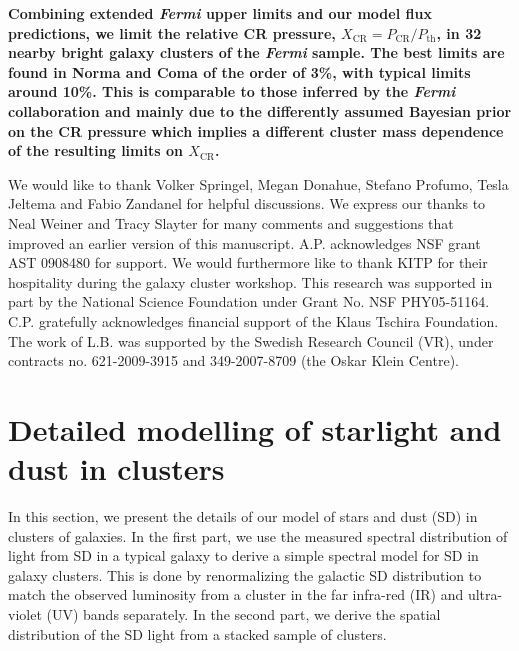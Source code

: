 \documentclass[10pt,aps,pra,reprint,amsmath,amsfonts,amssymb,showpacs,nofootinbib,floatfix]{revtex4-1}
\def\C#1{{\bf #1}}
\newcommand{\Fermi}{{\em Fermi}\xspace}
\newcommand{\rmn}{\mathrm}
\newcommand{\CR}{\rmn{CR}}
\begin{document}
\C{Combining extended \Fermi upper limits and our model flux
  predictions, we limit the relative CR pressure, $X_\CR =
  P_\CR/P_\rmn{th}$, in 32 nearby bright galaxy clusters of the \Fermi
  sample. The best limits are found in Norma and Coma of the order of
  3\%, with typical limits around 10\%. This is comparable to those
  inferred by the \Fermi collaboration \cite{2010ApJ...717L..71A} and
  mainly due to the differently assumed Bayesian prior on the CR
  pressure which implies a different cluster mass dependence of the
  resulting limits on $X_\CR$.}




\smallskip We would like to thank Volker Springel, Megan Donahue,
Stefano Profumo, Tesla Jeltema and Fabio Zandanel for helpful
discussions. We express our thanks to Neal Weiner and Tracy Slayter
for many comments and suggestions that improved an earlier version of
this manuscript. A.P. acknowledges NSF grant AST 0908480 for
support. We would furthermore like to thank KITP for their hospitality
during the galaxy cluster workshop. This research was supported in
part by the National Science Foundation under Grant No. NSF
PHY05-51164. C.P. gratefully acknowledges financial support of the
Klaus Tschira Foundation. The work of L.B. was supported by the
Swedish Research Council (VR), under contracts no. 621-2009-3915 and
349-2007-8709 (the Oskar Klein Centre).


\vspace{-0.7cm}

%
%

\appendix

\section{Detailed modelling of starlight and dust in clusters}
\label{sect:SD}
In this section, we present the details of our model of stars and dust
(SD) in clusters of galaxies. In the first part, we use the measured
spectral distribution of light from SD in a typical galaxy to derive a
simple spectral model for SD in galaxy clusters. This is done by
renormalizing the galactic SD distribution to match the observed luminosity
from a cluster in the far infra-red (IR) and ultra-violet (UV) bands
separately. In the second part, we derive the spatial distribution of
the SD light from a stacked sample of clusters.
\end{document}
